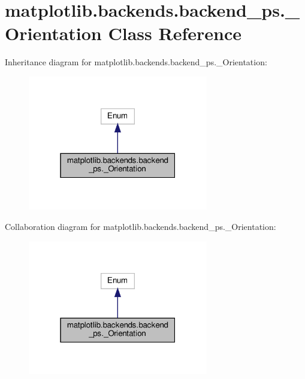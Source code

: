 \hypertarget{classmatplotlib_1_1backends_1_1backend__ps_1_1__Orientation}{}\section{matplotlib.\+backends.\+backend\+\_\+ps.\+\_\+\+Orientation Class Reference}
\label{classmatplotlib_1_1backends_1_1backend__ps_1_1__Orientation}


Inheritance diagram for matplotlib.\+backends.\+backend\+\_\+ps.\+\_\+\+Orientation\+:
\nopagebreak
\begin{figure}[H]
\begin{center}
\leavevmode
\includegraphics[width=223pt]{classmatplotlib_1_1backends_1_1backend__ps_1_1__Orientation__inherit__graph}
\end{center}
\end{figure}


Collaboration diagram for matplotlib.\+backends.\+backend\+\_\+ps.\+\_\+\+Orientation\+:
\nopagebreak
\begin{figure}[H]
\begin{center}
\leavevmode
\includegraphics[width=223pt]{classmatplotlib_1_1backends_1_1backend__ps_1_1__Orientation__coll__graph}
\end{center}
\end{figure}
